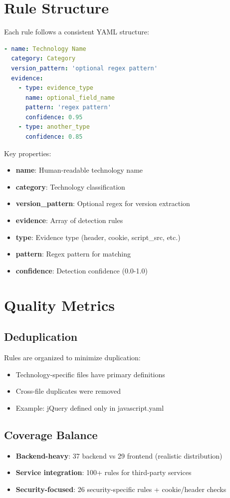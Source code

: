 \documentclass[11pt,a4paper,oneside]{article}
\begin{document}
\section{Rule Structure}

Each rule follows a consistent YAML structure:

\begin{lstlisting}[language=yaml]
- name: Technology Name
  category: Category
  version_pattern: 'optional regex pattern'
  evidence:
    - type: evidence_type
      name: optional_field_name
      pattern: 'regex pattern'
      confidence: 0.95
    - type: another_type
      confidence: 0.85
\end{lstlisting}

Key properties:

\begin{itemize}
    \item \textbf{name}: Human-readable technology name
    \item \textbf{category}: Technology classification
    \item \textbf{version\_pattern}: Optional regex for version extraction
    \item \textbf{evidence}: Array of detection rules
    \item \textbf{type}: Evidence type (header, cookie, script\_src, etc.)
    \item \textbf{pattern}: Regex pattern for matching
    \item \textbf{confidence}: Detection confidence (0.0-1.0)
\end{itemize}

\section{Quality Metrics}

\subsection{Deduplication}
Rules are organized to minimize duplication:
\begin{itemize}
    \item Technology-specific files have primary definitions
    \item Cross-file duplicates were removed
    \item Example: jQuery defined only in javascript.yaml
\end{itemize}

\subsection{Coverage Balance}
\begin{itemize}
    \item \textbf{Backend-heavy}: 37 backend vs 29 frontend (realistic distribution)
    \item \textbf{Service integration}: 100+ rules for third-party services
    \item \textbf{Security-focused}: 26 security-specific rules + cookie/header checks
\end{itemize}
\end{document}
